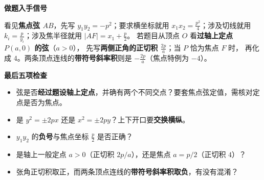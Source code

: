 \begin{summarybox}
\textbf{\textcolor{CSummary}{做题入手信号}}\par\smallskip
看见\textbf{焦点弦 $AB$}，先写 $y_1y_2=-p^2$；要求横坐标就用
$x_1x_2=\frac{p^2}{4}$；涉及切线就用 $k_i=\frac p{y_i}$；涉及焦半径就用
$|AF|=x_1+\frac p2$。
若题目从顶点 $O$ 看\textbf{过轴上定点 $P(a,0)$ 的弦}（$a>0$），
先写\textbf{两侧正角的正切积 $\frac{2p}{a}$}；当 $P$ 恰为焦点 $F$ 时，
再化成 $4$。两条顶点连线的\textbf{带符号斜率积}则是 $-\frac{2p}{a}$（焦点特例为 $-4$）。

\medskip
\textbf{\textcolor{CSummary}{最后五项检查}}\par\smallskip
\begin{itemize}[leftmargin=*,itemsep=0.25em]
 \item 弦是否\textbf{经过题设轴上定点}，并确有两个不同交点？要套焦点弦定值，需核对定点是否为焦点。
 \item 是 $y^2=\pm2px$ 还是 $x^2=\pm2py$？上下开口要\textbf{交换横纵}。
 \item $y_1y_2$ 的\textbf{负号}与焦点坐标 $\frac p2$ 是否正确？
 \item 是轴上一般定点 $a>0$（正切积 $2p/a$），还是焦点 $a=p/2$（正切积 $4$）？
 \item 张角正切积取正，而两条顶点连线的\textbf{带符号斜率积取负}，有没有混淆？
\end{itemize}
\end{summarybox}
